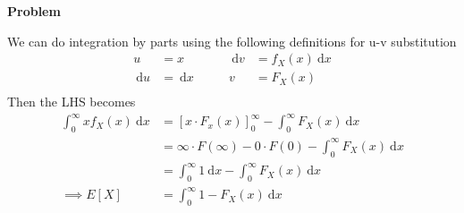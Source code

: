 \documentclass[12pt]{article}
\newenvironment{Ex}{\textbf{Problem}\vspace{.75em}\\}{}
\newcommand{\dd}[1]{\:\mathrm{d}{#1}}
\begin{document}
\begin{enumerate}
\begin{Ex}
\begin{solution}
\begin{equation}
      \end{equation}
      We can do integration by parts using the following definitions for
      u-v substitution
      \begin{equation}
        \label{eq:7-u-sub}
        \begin{aligned}
          u &= x \quad&\quad \dd{v}&=f_X(x)\dd{x} \\
          \dd{u}&=\dd{x} \quad&\quad v&=F_X(x) \\
        \end{aligned}
      \end{equation}
      Then the LHS becomes
      \begin{equation}
        \label{eq:7-sol-continued}
        \begin{aligned}
          \int_{0}^{\infty} x f_X(x) \dd{x} &=
          [x\cdot F_x(x)]_{0}^{\infty} - \int_{0}^{\infty}F_X(x)\dd{x} \\
          &= \infty\cdot F(\infty)-0\cdot F(0)-\int_{0}^{\infty}F_X(x)\dd{x} \\
          &= \int_0^{\infty}1\dd{x} - \int_{0}^{\infty}F_X(x)\dd{x} \\
          \implies E[X] &= \int_{0}^{\infty}1-F_X(x)\dd{x} \\
        \end{aligned}
      \end{equation}
    \end{solution}
  \end{Ex}
\end{enumerate}
\end{document}

